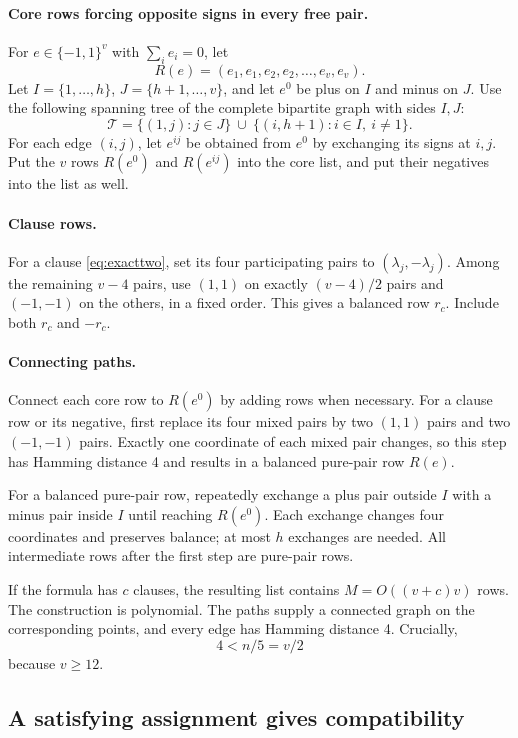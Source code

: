\documentclass[11pt,a4paper]{article}
\theoremstyle{remark}
\newcommand{\1}{\mathbf 1}
\begin{document}
\paragraph{Core rows forcing opposite signs in every free pair.}
For $e\in\{-1,1\}^v$ with $\sum_i e_i=0$, let
\[
 R(e)=(e_1,e_1,e_2,e_2,\ldots,e_v,e_v).
\]
Let $I=\{1,\ldots,h\}$, $J=\{h+1,\ldots,v\}$, and let $e^0$ be plus on $I$
and minus on $J$. Use the following spanning tree of the complete bipartite
graph with sides $I,J$:
\[
 \mathcal T=
 \{(1,j):j\in J\}
 \ \cup\
 \{(i,h+1):i\in I,\ i\ne1\}.
\]
For each edge $(i,j)$, let $e^{ij}$ be obtained from $e^0$ by exchanging its
signs at $i,j$. Put the $v$ rows $R(e^0)$ and $R(e^{ij})$ into the core list,
and put their negatives into the list as well.

\paragraph{Clause rows.}
For a clause \eqref{eq:exacttwo}, set its four participating pairs to
$(\lambda_j,-\lambda_j)$. Among the remaining $v-4$ pairs, use $(1,1)$ on
exactly $(v-4)/2$ pairs and $(-1,-1)$ on the others, in a fixed order.
This gives a balanced row $r_c$. Include both $r_c$ and $-r_c$.

\paragraph{Connecting paths.}
Connect each core row to $R(e^0)$ by adding rows when necessary.
For a clause row or its negative, first replace its four mixed pairs by
two $(1,1)$ pairs and two $(-1,-1)$ pairs. Exactly one coordinate of each
mixed pair changes, so this step has Hamming distance 4 and results in a
balanced pure-pair row $R(e)$.

For a balanced pure-pair row, repeatedly exchange a plus pair outside $I$
with a minus pair inside $I$ until reaching $R(e^0)$. Each exchange changes
four coordinates and preserves balance; at most $h$ exchanges are needed.
All intermediate rows after the first step are pure-pair rows.

If the formula has $c$ clauses, the resulting list contains
$M=O((v+c)v)$ rows. The construction is polynomial. The paths supply a
connected graph on the corresponding points, and every edge has Hamming
distance 4. Crucially,
\[
 4<n/5=v/2
\]
because $v\ge12$.

\subsection{A satisfying assignment gives compatibility}
\end{document}
